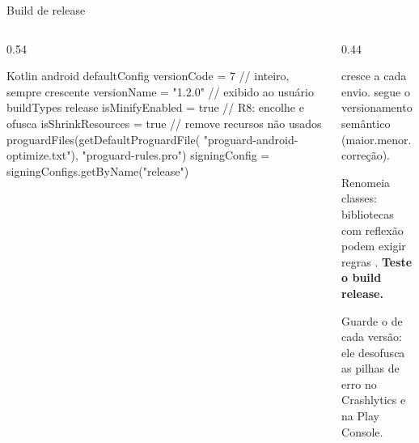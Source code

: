 \documentclass[aspectratio=169,10pt]{beamer}
\begin{document}
\begin{frame}[fragile]{Build de release}
  \begin{columns}[T]
    \begin{column}{0.54\textwidth}
\begin{codigo}[title=app/build.gradle.kts]{Kotlin}
android {
  defaultConfig {
    versionCode = 7          // inteiro, sempre crescente
    versionName = "1.2.0"    // exibido ao usuário
  }
  buildTypes {
    release {
      isMinifyEnabled = true      // R8: encolhe e ofusca
      isShrinkResources = true    // remove recursos não usados
      proguardFiles(getDefaultProguardFile(
          "proguard-android-optimize.txt"),
        "proguard-rules.pro")
      signingConfig = signingConfigs.getByName("release")
    }
  }
}
\end{codigo}
    \end{column}
    \begin{column}{0.44\textwidth}
      \begin{conceito}[Versionamento]
         cresce a cada envio.  segue o versionamento semântico (maior.menor.correção).
      \end{conceito}
      \begin{atencao}[R8]
        Renomeia classes: bibliotecas com reflexão podem exigir regras . \textbf{Teste o build release.}
      \end{atencao}
      \begin{dica}
        Guarde o  de cada versão: ele desofusca as pilhas de erro no Crashlytics e na Play Console.
      \end{dica}
    \end{column}
  \end{columns}
\end{frame}
\end{document}
